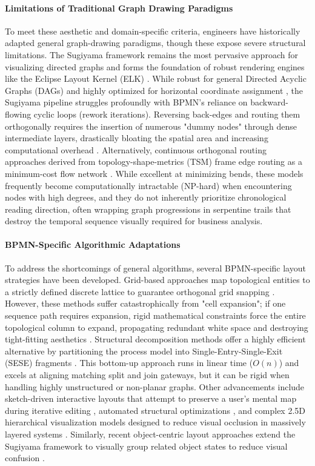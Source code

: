 \documentclass{article}
\begin{document}
	\paragraph{Limitations of Traditional Graph Drawing Paradigms}
	To meet these aesthetic and domain-specific criteria, engineers have historically adapted general graph-drawing paradigms, though these expose severe structural limitations. The Sugiyama framework remains the most pervasive approach for visualizing directed graphs and forms the foundation of robust rendering engines like the Eclipse Layout Kernel (ELK) \cite{ref_sugiyama, ref_gansner, ref_kasperowski}. While robust for general Directed Acyclic Graphs (DAGs) and highly optimized for horizontal coordinate assignment \cite{ref_brandes}, the Sugiyama pipeline struggles profoundly with BPMN's reliance on backward-flowing cyclic loops (rework iterations). Reversing back-edges and routing them orthogonally requires the insertion of numerous "dummy nodes" through dense intermediate layers, drastically bloating the spatial area and increasing computational overhead \cite{ref_sugiyama, ref_gansner}. Alternatively, continuous orthogonal routing approaches derived from topology-shape-metrics (TSM) frame edge routing as a minimum-cost flow network \cite{ref_tamassia}. While excellent at minimizing bends, these models frequently become computationally intractable (NP-hard) when encountering nodes with high degrees, and they do not inherently prioritize chronological reading direction, often wrapping graph progressions in serpentine trails that destroy the temporal sequence visually required for business analysis.
	
	\paragraph{BPMN-Specific Algorithmic Adaptations}
	To address the shortcomings of general algorithms, several BPMN-specific layout strategies have been developed. Grid-based approaches map topological entities to a strictly defined discrete lattice to guarantee orthogonal grid snapping \cite{ref_kitzmann}. However, these methods suffer catastrophically from "cell expansion"; if one sequence path requires expansion, rigid mathematical constraints force the entire topological column to expand, propagating redundant white space and destroying tight-fitting aesthetics \cite{ref_kitzmann}. Structural decomposition methods offer a highly efficient alternative by partitioning the process model into Single-Entry-Single-Exit (SESE) fragments \cite{ref_gschwind}. This bottom-up approach runs in linear time ($O(n)$) and excels at aligning matching split and join gateways, but it can be rigid when handling highly unstructured or non-planar graphs. Other advancements include sketch-driven interactive layouts that attempt to preserve a user's mental map during iterative editing \cite{ref_effinger_interactive, ref_effinger_study}, automated structural optimizations \cite{ref_contreras}, and complex 2.5D hierarchical visualization models designed to reduce visual occlusion in massively layered systems \cite{ref_hong}. Similarly, recent object-centric layout approaches extend the Sugiyama framework to visually group related object states to reduce visual confusion \cite{ref_pads}.
	
\end{document}
